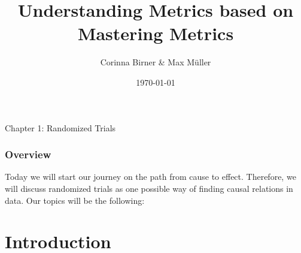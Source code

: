 \documentclass{beamer}
\title[Mastering Metrics]{Understanding Metrics based on Mastering Metrics } %
\author{Corinna Birner \& Max M{\"u}ller} %
\institute[JMU] %
{University of W{\"u}rzburg }\\ %
\date{\today} %
\begin{document}
\begin{frame}
\titlepage %
\end{frame}

\begin{frame}
\begin{center}
\textbf\Huge{Chapter 1: Randomized Trials}
\end{center}
\end{frame}

\begin{frame}
\frametitle{Overview} %
Today we will start our journey on the path from cause to effect. Therefore, we will discuss randomized trials as one possible way of finding causal relations in data. Our topics will be the following:

\tableofcontents %
\end{frame}


\section{Introduction}
\end{document}
